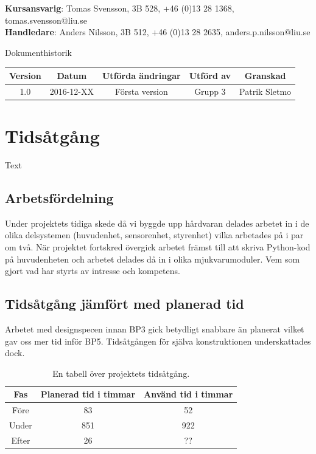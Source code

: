 \documentclass{article}
\begin{document}
\begin{center}
\textbf{Kursansvarig}: Tomas Svensson, 3B 528, +46 (0)13 28 1368, tomas.svensson@liu.se \\
\textbf{Handledare}: Anders Nilsson, 3B 512, +46 (0)13 28 2635, anders.p.nilsson@liu.se
\end{center}
\vspace*{\fill}
\clearpage

\renewcommand*\contentsname{Innehållsförteckning}
\tableofcontents
\clearpage


{
\sffamily
\centering
\large


{\huge 
Dokumenthistorik \\
}
\begin{table}[H]
\centering
\begin{tabular}{ | c | c | c | c | c |} 
\hline
\textbf{Version} & \textbf{Datum} & \textbf{Utförda ändringar} & \textbf{Utförd av } & \textbf{Granskad} \\
\hline
1.0 & 2016-12-XX & Första version & Grupp 3 & Patrik Sletmo \\
\hline

\end{tabular}
\end{table}
}

\clearpage
\section{Tidsåtgång}
Text


\subsection{Arbetsfördelning}
Under projektets tidiga skede då vi byggde upp hårdvaran delades arbetet in i de olika delsystemen (huvudenhet, sensorenhet, styrenhet) vilka arbetades på i par om två. När projektet fortskred övergick arbetet främst till att skriva Python-kod på huvudenheten och arbetet delades då in i olika mjukvarumoduler. Vem som gjort vad har styrts av intresse och kompetens.


\subsection{Tidsåtgång jämfört med planerad tid}
Arbetet med designspecen innan BP3 gick betydligt snabbare än planerat vilket gav oss mer tid inför BP5. Tidsåtgången för själva konstruktionen underskattades dock.

\begin{table}[H]
\centering
\caption{En tabell över projektets tidsåtgång.}
\begin{tabular}{ | c | c | c | }
\hline
Fas & Planerad tid i timmar & Använd tid i timmar \\
\hline
Före & 83 & 52 \\
\hline
Under & 851 & 922 \\
\hline
Efter & 26 & ?? \\
\hline
\end{tabular}
\label{table:tidsatgang}
\end{table}
\ \\
\end{document}
